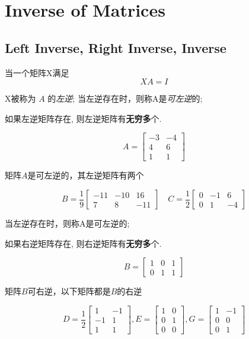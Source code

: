 \chapter{Inverse of Matrices}

\section{Left Inverse, Right Inverse, Inverse}

\begin{definition}[$A$的左逆]
    当一个矩阵X满足 $$ X A=I $$ 
    
    X被称为 $ A $ 的\textit{左逆}; 当左逆存在时，则称A是\textit{可左逆}的;
\end{definition}

    如果左逆矩阵存在, 则左逆矩阵有\textbf{无穷多}个.

\begin{example}
    $$ A=\left[\begin{array}{cc}-3 & -4 \\ 4 & 6 \\ 1 & 1\end{array}\right] $$

    矩阵$A$是可左逆的，其左逆矩阵有两个

    $$ B=\frac{1}{9}\left[\begin{array}{ccc}-11 & -10 & 16 \\ 7 & 8 & -11\end{array}\right] \quad C=\frac{1}{2}\left[\begin{array}{ccc}0 & -1 & 6 \\ 0 & 1 & -4\end{array}\right] $$
\end{example}

\begin{definition}[$A$的右逆]
    当左逆存在时，则称A是可左逆的;
\end{definition}

    如果右逆矩阵存在, 则右逆矩阵有\textbf{无穷多}个.


\begin{example}
    $$ B=\left[\begin{array}{lll}1 & 0 & 1 \\ 0 & 1 & 1\end{array}\right] $$

    矩阵$B$可右逆，以下矩阵都是$B$的右逆

    $$ D=\frac{1}{2}\left[\begin{array}{cc}1 & -1 \\ -1 & 1 \\ 1 & 1\end{array}\right], E=\left[\begin{array}{ll}1 & 0 \\ 0 & 1 \\ 0 & 0\end{array}\right], G=\left[\begin{array}{cc}1 & -1 \\ 0 & 0 \\ 0 & 1\end{array}\right] $$
\end{example}

